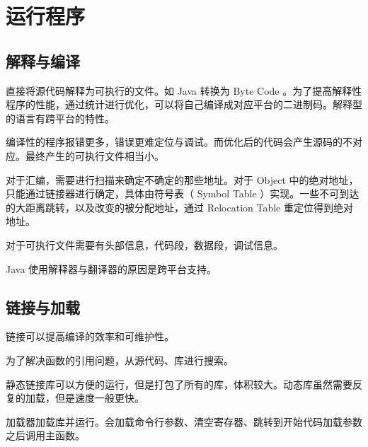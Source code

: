 \documentclass[cn,11pt,chinese,black,simple]{../elegantbook}
\begin{document}
\fi 
\def\chapname{05runningaprogram}

\chapter{运行程序}

\section{解释与编译}

直接将源代码解释为可执行的文件。如 Java 转换为 Byte Code 。为了提高解释性程序的性能，通过统计进行优化，可以将自己编译成对应平台的二进制码。解释型的语言有跨平台的特性。

编译性的程序报错更多，错误更难定位与调试。而优化后的代码会产生源码的不对应。最终产生的可执行文件相当小。

对于汇编，需要进行扫描来确定不确定的那些地址。对于 Object 中的绝对地址，只能通过链接器进行确定，具体由符号表（ Symbol Table ）实现。一些不可到达的大距离跳转，以及改变的被分配地址，通过 Relocation Table 重定位得到绝对地址。

对于可执行文件需要有头部信息，代码段，数据段，调试信息。

Java 使用解释器与翻译器的原因是跨平台支持。

\section{链接与加载}

链接可以提高编译的效率和可维护性。

为了解决函数的引用问题，从源代码、库进行搜索。

静态链接库可以方便的运行，但是打包了所有的库，体积较大。动态库虽然需要反复的加载，但是速度一般更快。

加载器加载库并运行。会加载命令行参数、清空寄存器、跳转到开始代码加载参数之后调用主函数。

\let\chapname\undefined
\ifx\mainclass\undefined
\end{document}
